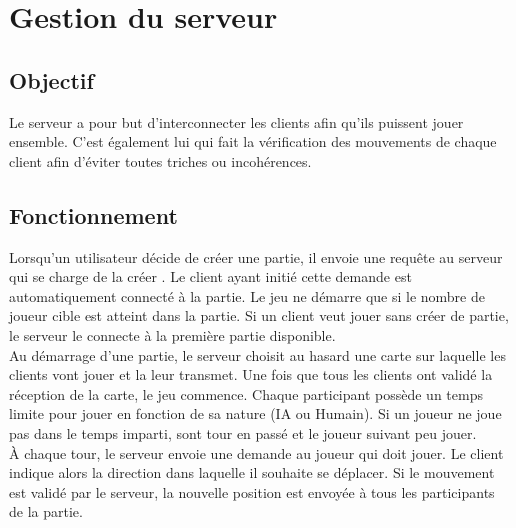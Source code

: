 \chapter{Gestion du serveur}

\section {Objectif}
Le serveur a pour but d'interconnecter les clients afin qu'ils puissent jouer ensemble. C'est également lui qui fait la vérification des mouvements de chaque client afin d'éviter toutes triches ou incohérences.
\section{Fonctionnement}
Lorsqu'un utilisateur décide de créer une partie, il envoie une requête au serveur qui se charge de la créer . Le client ayant initié cette demande est automatiquement connecté à la partie.
Le jeu ne démarre que si le nombre de joueur cible est atteint dans la partie.
Si un client veut jouer sans créer de partie, le serveur le connecte à la première partie disponible.\\
Au démarrage d'une partie, le serveur choisit au hasard une carte sur laquelle les clients vont jouer et la leur transmet. Une fois que tous les clients ont validé la réception de la carte, le jeu commence. Chaque participant possède un temps limite pour jouer en fonction de sa nature (IA ou Humain). Si un joueur ne joue pas dans le temps imparti, sont tour en passé et le joueur suivant peu jouer.\\
À chaque tour, le serveur envoie une demande au joueur qui doit jouer. Le client indique alors la direction dans laquelle il souhaite se déplacer. Si le mouvement est validé par le serveur, la nouvelle position est envoyée à tous les participants de la partie.

